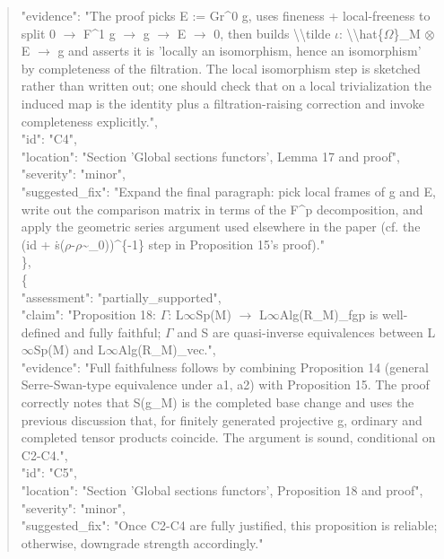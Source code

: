 \documentclass[11pt]{article}
\begin{document}
\begin{quote}
      "evidence": "The proof picks E := Gr\^{}0 g, uses fineness + local-freeness to split 0 \ensuremath{\to} F\^{}1 g \ensuremath{\to} g \ensuremath{\to} E \ensuremath{\to} 0, then builds \textbackslash{}\textbackslash{}tilde \ensuremath{\iota}: \textbackslash{}\textbackslash{}hat\{\ensuremath{\Omega}\}\_M \ensuremath{\otimes} E \ensuremath{\to} g and asserts it is 'locally an isomorphism, hence an isomorphism' by completeness of the filtration. The local isomorphism step is sketched rather than written out; one should check that on a local trivialization the induced map is the identity plus a filtration-raising correction and invoke completeness explicitly.",\\
      "id": "C4",\\
      "location": "Section 'Global sections functors', Lemma 17 and proof",\\
      "severity": "minor",\\
      "suggested\_fix": "Expand the final paragraph: pick local frames of g and E, write out the comparison matrix in terms of the F\^{}p decomposition, and apply the geometric series argument used elsewhere in the paper (cf. the (id + ṡ(\ensuremath{\rho}-\ensuremath{\rho}\~{}\_0))\^{}\{-1\} step in Proposition 15's proof)."\\
    \},\\
    \{\\
      "assessment": "partially\_supported",\\
      "claim": "Proposition 18: \ensuremath{\Gamma}: L\ensuremath{\infty}Sp(M) \ensuremath{\to} L\ensuremath{\infty}Alg(R\_M)\_fgp is well-defined and fully faithful; \ensuremath{\Gamma} and S are quasi-inverse equivalences between L\ensuremath{\infty}Sp(M) and L\ensuremath{\infty}Alg(R\_M)\_vec.",\\
      "evidence": "Full faithfulness follows by combining Proposition 14 (general Serre-Swan-type equivalence under a1, a2) with Proposition 15. The proof correctly notes that S(g\_M) is the completed base change and uses the previous discussion that, for finitely generated projective g, ordinary and completed tensor products coincide. The argument is sound, conditional on C2-C4.",\\
      "id": "C5",\\
      "location": "Section 'Global sections functors', Proposition 18 and proof",\\
      "severity": "minor",\\
      "suggested\_fix": "Once C2-C4 are fully justified, this proposition is reliable; otherwise, downgrade strength accordingly."\\

\end{quote}
\end{document}
